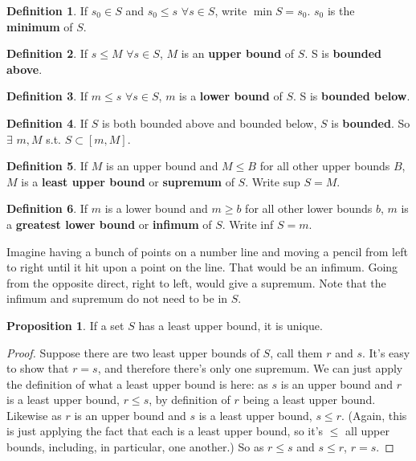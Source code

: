 \documentclass{article}
\theoremstyle{definition}
\newtheorem{definition}{Definition}[section]
\newtheorem{proposition}{Proposition}[section]
\begin{document}
\begin{definition}
If $s_0 \in S$ and $s_0 \le s$ $\forall s \in S$, write $\min S = s_0$. $s_0$ is the \textbf{minimum} of $S$.
\end{definition}

\begin{definition}
If $s \leq M$ $\forall s \in S$, $M$ is an \textbf{upper bound} of $S$. S is \textbf{bounded above}.
\end{definition}

\begin{definition}
If $m \leq s$ $\forall s \in S$, $m$ is a \textbf{lower bound} of $S$. S is \textbf{bounded below}.
\end{definition}

\begin{definition}
If $S$ is both bounded above and bounded below, $S$ is \textbf{bounded}. So $\exists$ $m, M$ s.t. $S \subset [m, M]$.
\end{definition}

\begin{definition}
If $M$ is an upper bound and $M \leq B$ for all other upper bounds $B$, $M$ is a \textbf{least upper bound} or \textbf{supremum} of $S$. Write sup $S = M$.
\end{definition}

\begin{definition}
If $m$ is a lower bound and $m \geq b$ for all other lower bounds $b$, $m$ is a \textbf{greatest lower bound} or \textbf{infimum} of $S$. Write inf $S = m$.
\end{definition}

Imagine having a bunch of points on a number line and moving a pencil from left to right until it hit upon a point on the line. That would be an infimum. Going from the opposite direct, right to left, would give a supremum. Note that the infimum and supremum do not need to be in $S$.

\begin{proposition}
If a set $S$ has a least upper bound, it is unique.
\end{proposition}

\begin{proof}
Suppose there are two least upper bounds of $S$, call them $r$ and $s$. It's easy to show that $r = s$, and therefore there's only one supremum. We can just apply the definition of what a least upper bound is here: as $s$ is an upper bound and $r$ is a least upper bound, $r \leq s$, by definition of $r$ being a least upper bound. Likewise as $r$ is an upper bound and $s$ is a least upper bound, $s \leq r$. (Again, this is just applying the fact that each is a least upper bound, so it's $\leq$ all upper bounds, including, in particular, one another.) So as $r \leq s$ and $s \leq r$, $r = s$.
\end{proof}
\end{document}
